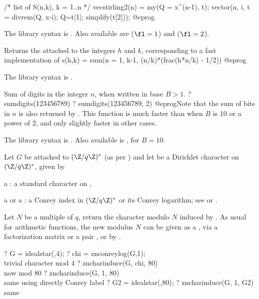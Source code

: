 /* list of S(n,k), k = 1..n */
vecstirling2(n) =
{ my(Q = x^(n-1), t);
  vector(n, i, t = divrem(Q, x-i); Q=t[1]; simplify(t[2]));
}
@eprog

The library syntax is .
Also available are 
($\fl=1$) and  ($\fl=2$).

\label{se:sumdedekind}
Returns the  attached to the integers $h$ and $k$,
 corresponding to a fast implementation of
 \bprog
  s(h,k) = sum(n = 1, k-1, (n/k)*(frac(h*n/k) - 1/2))
 @eprog

The library syntax is .

\label{se:sumdigits}
Sum of digits in the integer $n$, when written in base $B > 1$.
\bprog
? sumdigits(123456789)
? sumdigits(123456789, 2)
@eprog\noindent Note that the sum of bits in $n$ is also returned by
. This function is much faster than
 when $B$ is $10$ or a power of $2$, and only
slightly faster in other cases.

The library syntax is .
Also available is , for $B = 10$.

\label{se:zncharinduce}
Let $G$ be attached to $(\Z/q\Z)^*$ (as per )
and let  be a Dirichlet character on $(\Z/q\Z)^*$, given by

\item a : a standard character on ,

\item a  or a : a Conrey index in $(\Z/q\Z)^*$ or its
Conrey logarithm;
see  or .

Let $N$ be a multiple of $q$, return the character modulo $N$ induced by
. As usual for arithmetic functions, the new modulus $N$ can be
given as a , via a factorization matrix or a pair
\kbd{[N, factor(N)]}, or by .

\bprog
? G = idealstar(,4);
? chi = znconreylog(G,1); \\ trivial character mod 4
? zncharinduce(G, chi, 80)  \\ now mod 80
? zncharinduce(G, 1, 80)  \\ same using directly Conrey label
? G2 = idealstar(,80);
? zncharinduce(G, 1, G2)  \\ same


